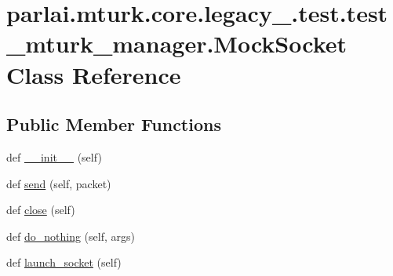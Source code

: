 \hypertarget{classparlai_1_1mturk_1_1core_1_1legacy__2018_1_1test_1_1test__mturk__manager_1_1MockSocket}{}\section{parlai.\+mturk.\+core.\+legacy\+\_.\+test.\+test\+\_\+mturk\+\_\+manager.\+Mock\+Socket Class Reference}
\label{classparlai_1_1mturk_1_1core_1_1legacy__2018_1_1test_1_1test__mturk__manager_1_1MockSocket}
\subsection*{Public Member Functions}
\begin{DoxyCompactItemize}
\item 
def \hyperlink{classparlai_1_1mturk_1_1core_1_1legacy__2018_1_1test_1_1test__mturk__manager_1_1MockSocket_a4d6d024810956b86b7a09b2662fe95aa}{\+\_\+\+\_\+init\+\_\+\+\_\+} (self)
\item 
def \hyperlink{classparlai_1_1mturk_1_1core_1_1legacy__2018_1_1test_1_1test__mturk__manager_1_1MockSocket_aad5e72145c25f36d32dfed7f4b3e55e6}{send} (self, packet)
\item 
def \hyperlink{classparlai_1_1mturk_1_1core_1_1legacy__2018_1_1test_1_1test__mturk__manager_1_1MockSocket_aeb0a775a19939054a82ce313a3bfc07f}{close} (self)
\item 
def \hyperlink{classparlai_1_1mturk_1_1core_1_1legacy__2018_1_1test_1_1test__mturk__manager_1_1MockSocket_aec8ee61199a5851c8984ee1ede1e6008}{do\+\_\+nothing} (self, args)
\item 
def \hyperlink{classparlai_1_1mturk_1_1core_1_1legacy__2018_1_1test_1_1test__mturk__manager_1_1MockSocket_a610fa5da10a66df185843eac56e16c1a}{launch\+\_\+socket} (self)
\end{DoxyCompactItemize}
